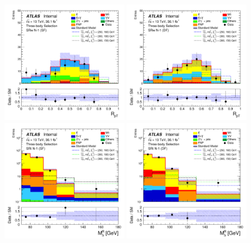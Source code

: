\begin{figure}[!htb]
    \begin{center}
        \includegraphics[width=0.48\textwidth]{figures/search_stop2l/results/srwNM1SF_RPT_nm1}
        \includegraphics[width=0.48\textwidth]{figures/search_stop2l/results/srwNM1_RPT_nm1}
        \includegraphics[width=0.48\textwidth]{figures/search_stop2l/results/srtNM1SF_MDR_nm1}
        \includegraphics[width=0.48\textwidth]{figures/search_stop2l/results/srtNM1_MDR_nm1}

\end{center}
\end{figure}
